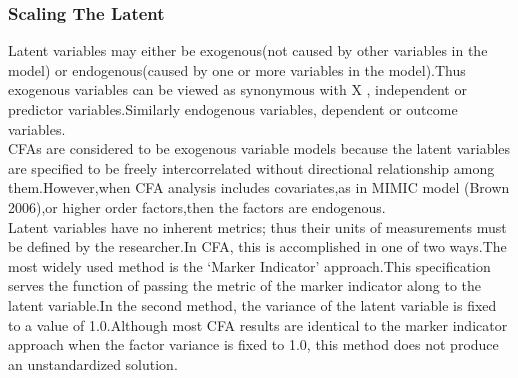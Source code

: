 \documentclass[12pt]{article}
\begin{document}
\subsubsection{Scaling The Latent}
Latent variables may either be exogenous(not caused by other variables in the model) or endogenous(caused by one or more variables in the model).Thus exogenous variables can be viewed as synonymous with X , independent or predictor variables.Similarly endogenous variables, dependent or outcome variables.\\

\noindent CFAs are considered to be exogenous variable models because the latent variables are specified to be freely intercorrelated without directional relationship among them.However,when CFA analysis includes covariates,as in MIMIC model (Brown 2006),or higher order factors,then the factors are endogenous.\\

\noindent Latent variables have no inherent metrics; thus their units of measurements must be defined by the researcher.In CFA, this is accomplished in one of two ways.The most widely used method is the ‘Marker Indicator’ approach.This specification serves the function of passing the metric of the marker indicator along to the latent variable.In the second method, the variance of the latent variable is fixed to a value of 1.0.Although most CFA results are identical to the marker indicator approach when the factor variance is fixed to 1.0, this method does not produce an unstandardized solution.
\end{document}
